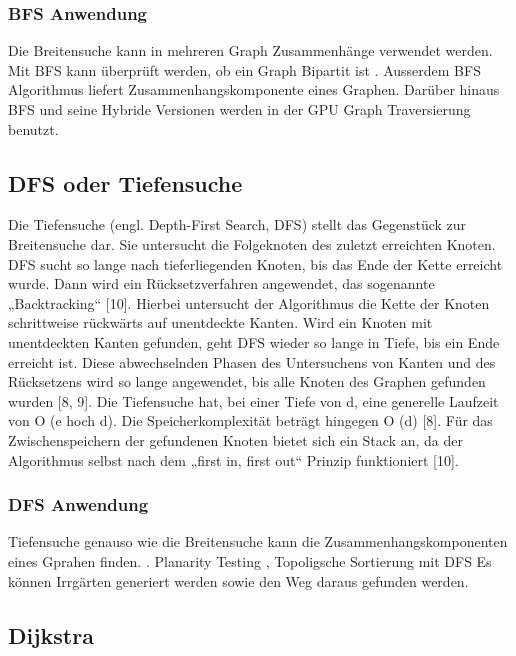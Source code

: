 \subsubsection{BFS Anwendung}
Die Breitensuche kann in mehreren Graph Zusammenhänge verwendet werden.  Mit BFS kann überprüft werden, ob ein Graph Bipartit ist \cite{propTest}. Ausserdem BFS Algorithmus liefert Zusammenhangskomponente eines Graphen\cite{schmitz}. Darüber hinaus BFS und seine Hybride Versionen\cite{effHyb} werden in der GPU Graph Traversierung benutzt\cite{scaleGPU}. 

\subsection{DFS oder Tiefensuche}

Die Tiefensuche (engl. Depth-First Search, DFS) stellt das Gegenstück zur Breitensuche dar. Sie untersucht die Folgeknoten des zuletzt erreichten Knoten. DFS sucht so lange nach tieferliegenden Knoten, bis das Ende der Kette erreicht wurde. Dann wird ein Rücksetzverfahren angewendet, das sogenannte „Backtracking“ [10]. 
Hierbei untersucht der Algorithmus die Kette der Knoten schrittweise rückwärts auf unentdeckte Kanten. Wird ein Knoten mit unentdeckten Kanten gefunden, geht DFS wieder so lange in Tiefe, bis ein Ende erreicht ist. Diese abwechselnden Phasen des Untersuchens von Kanten und des Rücksetzens wird so lange angewendet, bis alle Knoten des Graphen gefunden wurden [8, 9]. Die Tiefensuche hat, bei einer Tiefe von d, eine generelle Laufzeit von O (e hoch d). Die Speicherkomplexität beträgt hingegen O (d) [8]. Für das Zwischenspeichern der gefundenen Knoten bietet sich ein Stack an, da der Algorithmus selbst nach dem „first in, first out“ Prinzip funktioniert [10].  

\subsubsection{DFS Anwendung}
Tiefensuche genauso wie die Breitensuche kann die Zusammenhangskomponenten eines Gprahen finden. \cite{schmitz} \cite{dfs}.  Planarity Testing \cite{dfsPlanar}, Topoligsche Sortierung mit DFS
Es können Irrgärten generiert werden sowie den Weg daraus gefunden werden\cite{examMaze}.


\subsection{Dijkstra}

